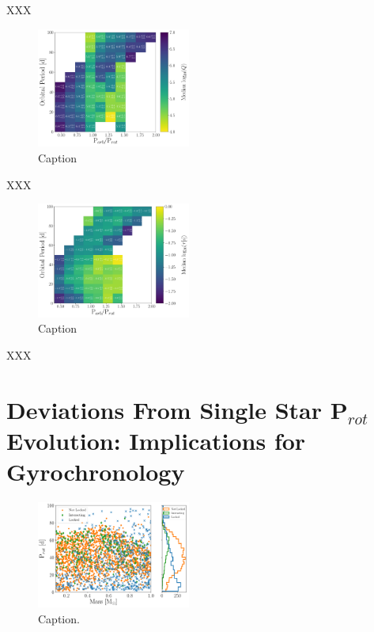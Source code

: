 \documentclass[twocolumn]{aastex61}
\begin{document}
XXX

\begin{figure}
	\includegraphics[width=0.45\textwidth]{../Plots/porbProtPorbQHist.pdf}
   \caption{Caption}%
    \label{fig:qmap}%
\end{figure}

XXX

\begin{figure}
	\includegraphics[width=0.45\textwidth]{../Plots/porbProtPorbTauHist.pdf}
   \caption{Caption}%
    \label{fig:taumap}%
\end{figure}

XXX

\section{Deviations From Single Star P$_{rot}$ Evolution: Implications for Gyrochronology} \label{sec:gyro}

\begin{figure}
	\includegraphics[width=0.45\textwidth]{../Plots/lockedCPL.pdf}
   \caption{Caption.}%
    \label{fig:lockedCPL}%
\end{figure}
\end{document}
